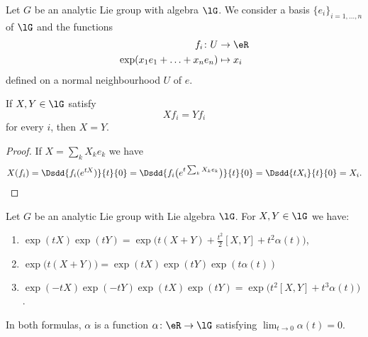 \begin{lemma}       \label{LEMooWKFIooRHsrFX}
    Let \( G\) be an analytic Lie group with algebra \( \lG\). We consider a basis \( \{ e_i \}_{i=1,\ldots, n}\) of \( \lG\) and the functions
    \begin{equation}
        \begin{aligned}
            f_i\colon U&\to \eR \\
            \exp(x_1e_1+\ldots+x_ne_n)&\mapsto x_i 
        \end{aligned}
    \end{equation}
    defined on a normal neighbourhood \( U\) of \( e\).
    
    If \( X,Y\in \lG\) satisfy
    \begin{equation}
        Xf_i=Yf_i
    \end{equation}
    for every \( i\), then \( X=Y\).
\end{lemma}

\begin{proof}
    If \( X=\sum_kX_ke_k\) we have
    \begin{equation}
        X(f_i)=\Dsdd{ f_i( e^{tX}) }{t}{0}=\Dsdd{ f_i\big(  e^{t\sum_kX_ke_k} \big) }{t}{0}=\Dsdd{ tX_i }{t}{0}=X_i.
    \end{equation}
\end{proof}

\begin{lemma}     \label{LEMooMJBRooMOuJpa}
    Let \( G\) be an analytic Lie group with Lie algebra \( \lG\). For \( X,Y\in \lG\) we have:
    \begin{enumerate}
        \item       \label{ITEMooHVOIooKDrUSw}
            \( \exp(tX)\exp(tY)=\exp\big( t(X+Y)+\frac{ t^2 }{2}[X,Y]+t^2\alpha(t) \big)\),
        \item       \label{ITEMooWIQIooHphJcP}
            \( \exp\big( t(X+Y) \big)=\exp(tX)\exp(tY)\exp(t\alpha(t))\)
        \item       \label{ITEMooVMDCooExpIrp}
            \( \exp(-tX)\exp(-tY)\exp(tX)\exp(tY)=\exp\big( t^2[X,Y]+t^3\alpha(t) \big)\).
    \end{enumerate}
    In both formulas, \( \alpha\) is a function \( \alpha\colon \eR\to \lG\) satisfying \( \lim_{t\to 0} \alpha(t)=0\).
\end{lemma}

